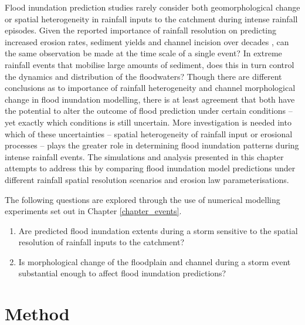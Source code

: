 Flood inundation prediction studies rarely consider both geomorphological change or spatial heterogeneity in rainfall inputs to the catchment during intense rainfall episodes. Given the reported importance of rainfall resolution on predicting increased erosion rates, sediment yields and channel incision over decades \citep{deluis2010rainfall,coulthard2016sensitivity}, can the same observation be made at the time scale of a single event? In extreme rainfall events that mobilise large amounts of sediment, does this in turn control the dynamics and distribution of the floodwaters? Though there are different conclusions as to importance of rainfall heterogeneity and channel morphological change in flood inundation modelling, there is at least agreement that both have the potential to alter the outcome of flood prediction under certain conditions -- yet exactly which conditions is still uncertain. More investigation is needed into which of these uncertainties -- spatial heterogeneity of rainfall input or erosional processes -- plays the greater role in determining flood inundation patterns during intense rainfall events. The simulations and analysis presented in this chapter attempts to address this by comparing flood inundation model predictions under different rainfall spatial resolution scenarios and erosion law parameterisations. 


The following questions are explored through the use of numerical modelling experiments set out in Chapter \ref{chapter_events}.

\begin{enumerate}
\item Are predicted flood inundation extents during a storm sensitive to the spatial resolution of rainfall inputs to the catchment?
\item Is morphological change of the floodplain and channel during a storm event substantial enough to affect flood inundation predictions?
\end{enumerate}

\section{Method}

